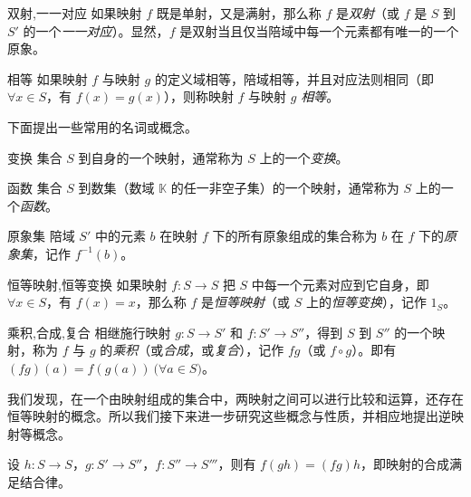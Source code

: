 \begin{definition}{双射,一一对应}
	如果映射 $f$ 既是单射，又是满射，那么称 $f$ 是\emph{双射}（或 $f$ 是 $S$ 到 $S'$ 的一个\emph{一一对应}）。显然，$f$ 是双射当且仅当陪域中每一个元素都有唯一的一个原象。
\end{definition}

\begin{definition}{相等}
	 如果映射 $f$ 与映射 $g$ 的定义域相等，陪域相等，并且对应法则相同（即 $\forall x \in S$，有 $f(x) = g(x)$），则称映射 $f$ 与映射 $g$ \emph{相等}。
\end{definition}

下面提出一些常用的名词或概念。

\begin{definition}{变换}
	集合 $S$ 到自身的一个映射，通常称为 $S$ 上的一个\emph{变换}。
\end{definition}

\begin{definition}{函数}
	集合 $S$ 到数集（数域 $\mathbb K$ 的任一非空子集）的一个映射，通常称为 $S$ 上的一个\emph{函数}。
\end{definition}

\begin{definition}{原象集}
	陪域 $S'$ 中的元素 $b$ 在映射 $f$ 下的所有原象组成的集合称为 $b$ 在 $f$ 下的\emph{原象集}，记作 $f^{-1}(b)$。
\end{definition}

\begin{definition}{恒等映射,恒等变换}
	如果映射 $f \colon S \to S$ 把 $S$ 中每一个元素对应到它自身，即 $\forall x \in S$，有 $f(x) = x$，那么称 $f$ 是\emph{恒等映射}（或 $S$ 上的\emph{恒等变换}），记作 $1_S$。
\end{definition}

\begin{definition}{乘积,合成,复合}
	相继施行映射 $g: S \to S'$ 和 $f \colon S' \to S''$，得到 $S$ 到 $S''$ 的一个映射，称为 $f$ 与 $g$ 的\emph{乘积}（或\emph{合成}，或\emph{复合}），记作 $fg$（或 $f \circ g$）。即有 $(fg)(a) = f(g(a)) \pod{\forall a \in S}$。
\end{definition}

我们发现，在一个由映射组成的集合中，两映射之间可以进行比较和运算，还存在恒等映射的概念。所以我们接下来进一步研究这些概念与性质，并相应地提出逆映射等概念。

\begin{theorem}
	设 $h \colon S \to S$，$g \colon S' \to S''$，$f \colon S'' \to S'''$，则有 $f(gh) = (fg)h$，即映射的合成满足结合律。
\end{theorem}

